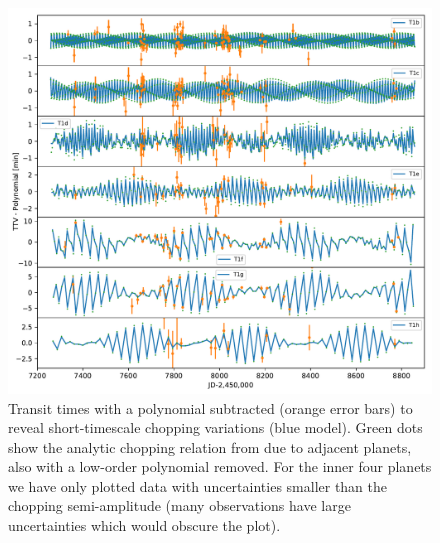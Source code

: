 \documentclass[fleqn,usenatbib]{mnras} %
\begin{document}
\begin{figure}
    \centering
    \includegraphics[width=\hsize]{figures/T1_chopping.pdf}
    \caption{Transit times with a polynomial subtracted (orange error bars) to reveal short-timescale chopping variations (blue model).  Green dots show the analytic chopping relation from \citet{Agol2005,Deck2015} due to adjacent planets, also with a low-order polynomial removed. For the inner four planets we have
    only plotted data with
    uncertainties smaller than the chopping semi-amplitude  (many observations have large uncertainties which would obscure the plot).}
    \label{fig:chopping}
\end{figure}
\end{document}
